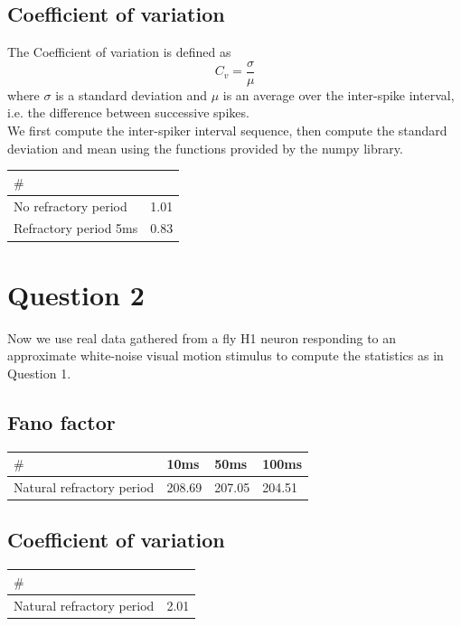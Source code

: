 \documentclass[12pt]{article}
\begin{document}
\subsection{Coefficient of variation}
The Coefficient of variation is defined as
\begin{equation}
    C_v = \frac{\sigma}{\mu}
\end{equation}
where $\sigma$ is a standard deviation and $\mu$ is an average over the inter-spike interval, i.e. the difference between successive spikes.\\
We first compute the inter-spiker interval sequence, then compute the standard deviation and mean using the functions provided by the numpy library.
\begin{center}
    \begin{tabular}{ | m{4cm} | m{2cm}|  } 
    \hline
    $\#$ &   \\ 
    \hline
    No refractory  period & 1.01 \\ 
    \hline
    Refractory period 5ms & 0.83 \\ 
    \hline
    \end{tabular}
\end{center}

\section{Question 2}
Now we use real data gathered from a fly H1 neuron responding to an approximate white-noise visual motion
stimulus to compute the statistics as in Question 1.
\subsection{Fano factor}
\begin{center}
    \begin{tabular}{ | m{5cm} | m{2cm}| m{2cm} | m{2cm} | } 
    \hline
    $\#$ & 10ms & 50ms & 100ms \\ 
    \hline
    Natural refractory period & 208.69 & 207.05 & 204.51\\ 
    \hline
    \end{tabular}
\end{center}

\subsection{Coefficient of variation}
\begin{center}
    \begin{tabular}{ | m{5cm} | m{2cm}|  } 
    \hline
    $\#$ &   \\ 
    \hline
    Natural refractory period & 2.01 \\ 
    \hline
    \end{tabular}
\end{center}
\end{document}
